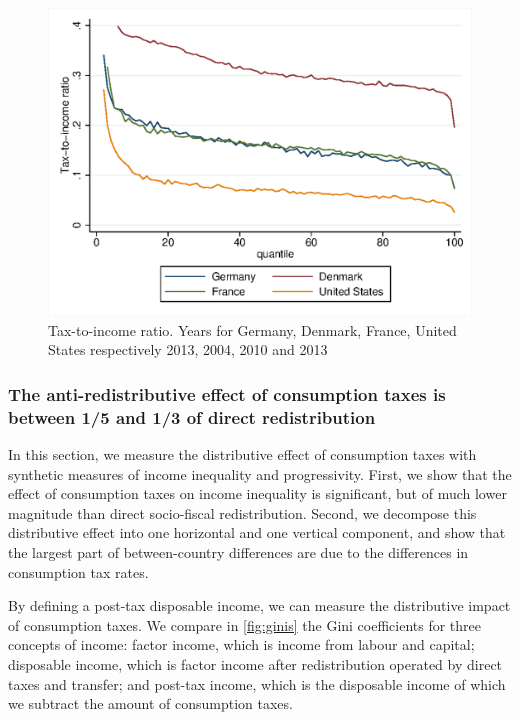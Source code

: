 \documentclass[12pt]{article}
\begin{document}
\begin{figure}[hp]
\centering
\includegraphics[height=0.42\textheight]{images/19-02_de-dk-fr-us_effort_rates}
\caption{Tax-to-income ratio. Years for Germany, Denmark, France, United States respectively 2013, 2004, 2010 and 2013}
\label{fig:effort_rate}  
\end{figure}

\subsubsection{The anti-redistributive effect of consumption taxes is between 1/5 and 1/3 of direct redistribution}
In this section, we measure the distributive effect of consumption taxes with synthetic measures of income inequality and progressivity. First, we show that the effect of consumption taxes on income inequality is significant, but of much lower magnitude than direct socio-fiscal redistribution. Second, we decompose this distributive effect into one horizontal and one vertical component, and show that the largest part of between-country differences are due to the differences in consumption tax rates.

By defining a post-tax disposable income, we can measure the distributive impact of consumption taxes. We compare in \cref{fig:ginis} the Gini coefficients for three concepts of income: factor income, which is income from labour and capital; disposable income, which is factor income after redistribution operated by direct taxes and transfer; and post-tax income, which is the disposable income of which we subtract the amount of consumption taxes.
\end{document}
